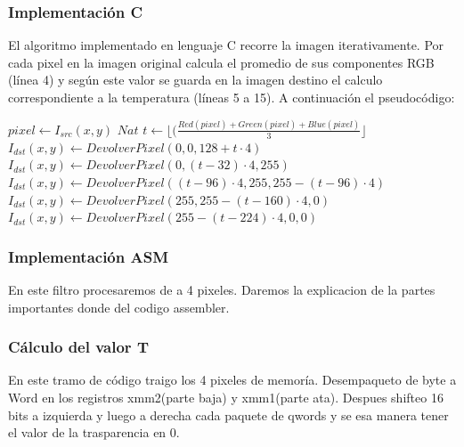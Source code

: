 \hfill
\subsubsection{Implementación C}

El algoritmo implementado en lenguaje C recorre la imagen iterativamente. Por cada pixel en la imagen original calcula el promedio de sus componentes RGB (línea 4) y según este valor se guarda en la imagen destino el calculo correspondiente a la temperatura (líneas 5 a 15). A continuación el pseudocódigo:
	
\begin{algorithm}[H]
  \begin{algorithmic}[1]
				\STATE $ pixel \gets I_{src}(x,y)$
				\STATE $Nat $ $ t \gets \lfloor(\frac{Red(pixel)+Green(pixel)+Blue(pixel)}{3}\rfloor$
					\STATE $I_{dst}(x,y) \gets DevolverPixel(0,0,128+t \cdot 4)$
					\STATE $I_{dst}(x,y) \gets DevolverPixel(0,(t-32) \cdot 4,255)$
					\STATE $I_{dst}(x,y) \gets DevolverPixel((t-96) \cdot 4,255, 255-(t-96) \cdot 4)$
					\STATE $I_{dst}(x,y) \gets DevolverPixel(255, 255-(t-160) \cdot 4, 0)$
				\ELSE		
					\STATE $I_{dst}(x,y) \gets DevolverPixel(255-(t-224) \cdot 4, 0, 0)$
				\ENDIF	
			\ENDFOR
		 \ENDFOR
  \end{algorithmic}
  \caption{$temperature (I_{src}, I_{dst})$}
  \label{alg:temperature}
\end{algorithm}	

\subsubsection{Implementación ASM}
En este filtro procesaremos de a 4 pixeles. Daremos la explicacion de la partes importantes donde del codigo assembler.

\subsubsection*{Cálculo del valor T}

En este tramo de código traigo los 4 pixeles de memoría. Desempaqueto de byte a Word en los registros xmm2(parte baja) y xmm1(parte ata). Despues shifteo 16 bits a izquierda y luego a derecha cada paquete de qwords y se esa manera tener el valor de la trasparencia en 0.


